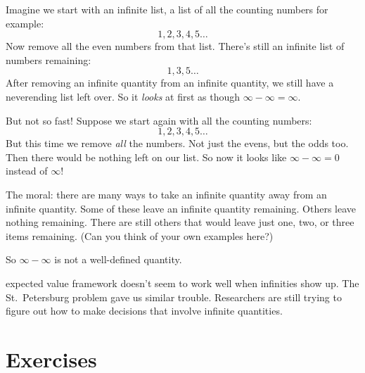 \documentclass[justified]{tufte-book}
\theoremstyle{definition}
\theoremstyle{definition}
\theoremstyle{definition}
\theoremstyle{remark}
\begin{document}
Imagine we start with an infinite list, a list of all the counting
numbers for example: \[ 1, 2, 3, 4, 5 \ldots \] Now remove all the even
numbers from that list. There's still an infinite list of numbers
remaining: \[ 1, 3, 5 \ldots \] After removing an infinite quantity from
an infinite quantity, we still have a neverending list left over. So it
\emph{looks} at first as though \(\infty - \infty = \infty\).

But not so fast! Suppose we start again with all the counting numbers:
\[ 1, 2, 3, 4, 5 \ldots \] But this time we remove \emph{all} the
numbers. Not just the evens, but the odds too. Then there would be
nothing left on our list. So now it looks like \(\infty - \infty = 0\)
instead of \(\infty\)!

The moral: there are many ways to take an infinite quantity away from an
infinite quantity. Some of these leave an infinite quantity remaining.
Others leave nothing remaining. There are still others that would leave
just one, two, or three items remaining. (Can you think of your own
examples here?)

So \(\infty - \infty\) is not a well-defined quantity.

 expected value framework doesn't seem to work well when
infinities show up. The St.~Petersburg problem gave us similar trouble.
Researchers are still trying to figure out how to make decisions that
involve infinite quantities.

\hypertarget{exercises-11}{%
\section*{Exercises}\label{exercises-11}}
\end{document}
